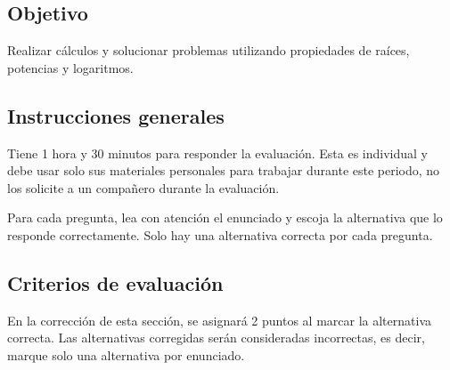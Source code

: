 \documentclass[]{srs}
\begin{document}
\subsection*{Objetivo}
Realizar cálculos y solucionar problemas utilizando propiedades de raíces, potencias y
logaritmos.

\subsection*{Instrucciones generales}
Tiene 1 hora y 30 minutos para responder la evaluación. Esta es individual y debe
usar solo sus materiales personales para trabajar durante este periodo, no los solicite
a un compañero durante la evaluación.

Para cada pregunta, lea con atención el enunciado y escoja la alternativa que lo
responde correctamente. Solo hay una alternativa correcta por cada pregunta.

\subsection*{Criterios de evaluación}
En la corrección de esta sección, se asignará 2 puntos al marcar la alternativa correcta.
Las alternativas corregidas serán consideradas incorrectas, es decir, marque solo una
alternativa por enunciado.

\separador[2mm]
\end{document}

